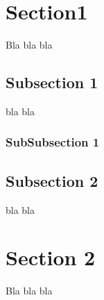 \documentclass{article}
\begin{document}
\listoftables

\pagebreak


\section{Section1}
Bla bla bla 
\subsection{Subsection 1}
bla bla
\subsubsection{SubSubsection 1}

\subsection{Subsection 2}
bla bla

\section{Section 2}
Bla bla bla \cite{CountdownTimer}







\end{document}
